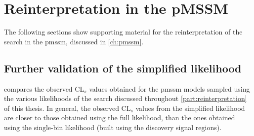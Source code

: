 
\chapter{Reinterpretation in the pMSSM}
\ifpdf
\graphicspath{{chapter-pmssm/Figs/Raster/}{chapter-pmssm/Figs/PDF/}{chapter-pmssm/Figs/}}
\else
\graphicspath{{chapter-pmssm/Figs/Vector/}{chapter-pmssm/Figs/}}
\fi

The following sections show supporting material for the reinterpretation of the \onelepton search in the \gls{pmssm}, discussed in \cref{ch:pmssm}.


\section{Further validation of the simplified likelihood}

 compares the observed CL$_s$ values obtained for the \gls{pmssm} models sampled using the various likelihoods of the \onelepton search  discussed throughout \cref{part:reinterpretation} of this thesis. In general, the observed CL$_s$ values from the simplified likelihood are closer to those obtained using the full likelihood, than the ones obtained using the single-bin likelihood (built using the discovery signal regions).

